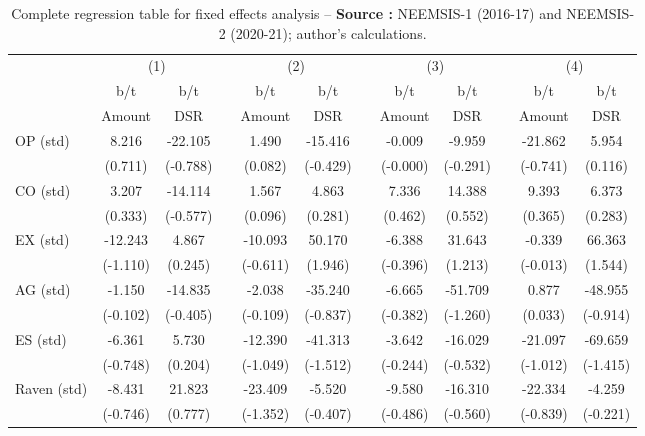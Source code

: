 {\tiny\tabcolsep=0pt
    \begin{longtable}{@{\extracolsep{\fill}}lccccccccccc}
	\caption{Complete regression table for fixed effects analysis --  \textbf{Source :} NEEMSIS-1 (2016-17) and NEEMSIS-2 (2020-21); author's calculations.} \\
    \toprule
      & \multicolumn{2}{c}{(1)} &   & \multicolumn{2}{c}{(2)} &   & \multicolumn{2}{c}{(3)} &   & \multicolumn{2}{c}{(4)} \\
\cmidrule{2-3}\cmidrule{5-6}\cmidrule{8-9}\cmidrule{11-12}      & b/t & b/t &   & b/t & b/t &   & b/t & b/t &   & b/t & b/t \\
      & Amount & DSR &   & Amount & DSR &   & Amount & DSR &   & Amount & DSR \\
    \midrule
    OP (std) & 8.216 & -22.105 &       & 1.490 & -15.416 &       & -0.009 & -9.959 &       & -21.862 & 5.954 \\
          & (0.711) & (-0.788) &       & (0.082) & (-0.429) &       & (-0.000) & (-0.291) &       & (-0.741) & (0.116) \\
    CO (std) & 3.207 & -14.114 &       & 1.567 & 4.863 &       & 7.336 & 14.388 &       & 9.393 & 6.373 \\
          & (0.333) & (-0.577) &       & (0.096) & (0.281) &       & (0.462) & (0.552) &       & (0.365) & (0.283) \\
    EX (std) & -12.243 & 4.867 &       & -10.093 & 50.170 &       & -6.388 & 31.643 &       & -0.339 & 66.363 \\
          & (-1.110) & (0.245) &       & (-0.611) & (1.946) &       & (-0.396) & (1.213) &       & (-0.013) & (1.544) \\
    AG (std) & -1.150 & -14.835 &       & -2.038 & -35.240 &       & -6.665 & -51.709 &       & 0.877 & -48.955 \\
          & (-0.102) & (-0.405) &       & (-0.109) & (-0.837) &       & (-0.382) & (-1.260) &       & (0.033) & (-0.914) \\
    ES (std) & -6.361 & 5.730 &       & -12.390 & -41.313 &       & -3.642 & -16.029 &       & -21.097 & -69.659 \\
          & (-0.748) & (0.204) &       & (-1.049) & (-1.512) &       & (-0.244) & (-0.532) &       & (-1.012) & (-1.415) \\
    Raven (std) & -8.431 & 21.823 &       & -23.409 & -5.520 &       & -9.580 & -16.310 &       & -22.334 & -4.259 \\
          & (-0.746) & (0.777) &       & (-1.352) & (-0.407) &       & (-0.486) & (-0.560) &       & (-0.839) & (-0.221) \\

\end{longtable}}
